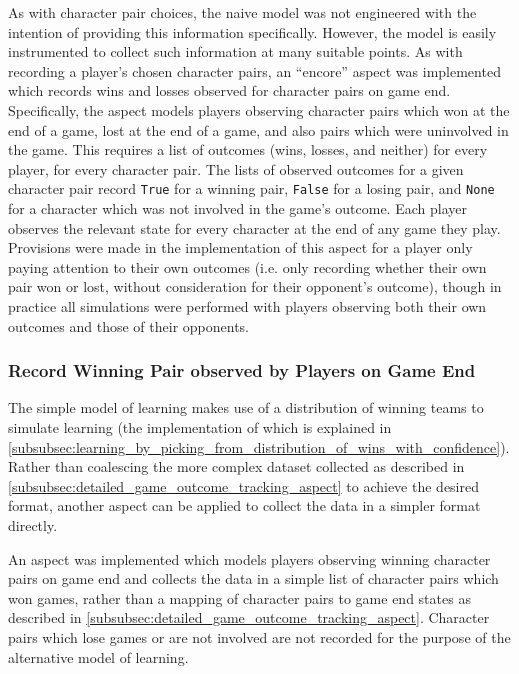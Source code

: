 As with character pair choices, the naive model was not engineered with the
intention of providing this information specifically. However, the model is
easily instrumented to collect such information at many suitable points. As with
recording a player's chosen character pairs, an ``encore'' aspect was
implemented which records wins and losses observed for character pairs on game
end. Specifically, the aspect models players observing character pairs which won
at the end of a game, lost at the end of a game, and also pairs which were
uninvolved in the game. This requires a list of outcomes (wins, losses, and
neither) for every player, for every character pair. The lists of observed
outcomes for a given character pair record \lstinline{True} for a winning pair,
\lstinline{False} for a losing pair, and \lstinline{None} for a character which
was not involved in the game's outcome. Each player observes the relevant state
for every character at the end of any game they play. Provisions were made in
the implementation of this aspect for a player only paying attention to their
own outcomes (i.e. only recording whether their own pair won or lost, without
consideration for their opponent's outcome), though in practice all simulations
were performed with players observing both their own outcomes and those of their
opponents.

\subsubsection{Record Winning Pair observed by Players on Game End}
\label{subsubsec:aspect_to_observe_winning_pair}

The simple model of learning makes use of a distribution of winning teams to
simulate learning (the implementation of which is explained in
\cref{subsubsec:learning_by_picking_from_distribution_of_wins_with_confidence}).
Rather than coalescing the more complex dataset collected as described in
\cref{subsubsec:detailed_game_outcome_tracking_aspect} to achieve the desired
format, another aspect can be applied to collect the data in a simpler format
directly.

An aspect was implemented which models players observing winning character
pairs on game end and collects the data in a simple list of character pairs
which won games, rather than a mapping of character pairs to game end
states as described in \cref{subsubsec:detailed_game_outcome_tracking_aspect}.
Character pairs which lose games or are not involved are not recorded for the
purpose of the alternative model of learning.

